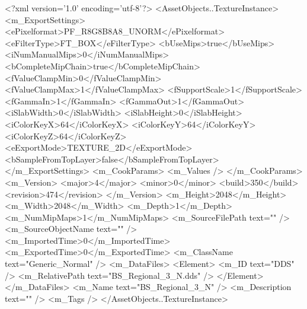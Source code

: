 <?xml version='1.0' encoding='utf-8'?>
<AssetObjects..TextureInstance>
  <m_ExportSettings>
    <ePixelformat>PF_R8G8B8A8_UNORM</ePixelformat>
    <eFilterType>FT_BOX</eFilterType>
    <bUseMips>true</bUseMips>
    <iNumManualMips>0</iNumManualMips>
    <bCompleteMipChain>true</bCompleteMipChain>
    <fValueClampMin>0</fValueClampMin>
    <fValueClampMax>1</fValueClampMax>
    <fSupportScale>1</fSupportScale>
    <fGammaIn>1</fGammaIn>
    <fGammaOut>1</fGammaOut>
    <iSlabWidth>0</iSlabWidth>
    <iSlabHeight>0</iSlabHeight>
    <iColorKeyX>64</iColorKeyX>
    <iColorKeyY>64</iColorKeyY>
    <iColorKeyZ>64</iColorKeyZ>
    <eExportMode>TEXTURE_2D</eExportMode>
    <bSampleFromTopLayer>false</bSampleFromTopLayer>
  </m_ExportSettings>
  <m_CookParams>
    <m_Values />
  </m_CookParams>
  <m_Version>
    <major>4</major>
    <minor>0</minor>
    <build>350</build>
    <revision>474</revision>
  </m_Version>
  <m_Height>2048</m_Height>
  <m_Width>2048</m_Width>
  <m_Depth>1</m_Depth>
  <m_NumMipMaps>1</m_NumMipMaps>
  <m_SourceFilePath text="" />
  <m_SourceObjectName text="" />
  <m_ImportedTime>0</m_ImportedTime>
  <m_ExportedTime>0</m_ExportedTime>
  <m_ClassName text="Generic_Normal" />
  <m_DataFiles>
    <Element>
      <m_ID text="DDS" />
      <m_RelativePath text="BS_Regional_3_N.dds" />
    </Element>
  </m_DataFiles>
  <m_Name text="BS_Regional_3_N" />
  <m_Description text="" />
  <m_Tags />
</AssetObjects..TextureInstance>